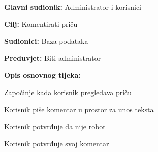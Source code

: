 					\noindent {}
					\begin{packed_item}
						
						\item \textbf{Glavni sudionik: }Administrator i korisnici
						\item  \textbf{Cilj:} Komentirati priču
						\item  \textbf{Sudionici:} Baza podataka
						\item  \textbf{Preduvjet:} Biti administrator
						\item  \textbf{Opis osnovnog tijeka:}
						
						\item[] \begin{packed_enum}
							
							\item Započinje kada korisnik pregledava priču
							\item Korisnik piše komentar u prostor za unos teksta
							\item Korisnik potvrđuje da nije robot
							\item Korisnik potvrđuje svoj komentar
						\end{packed_enum}
						
					\end{packed_item}
				
